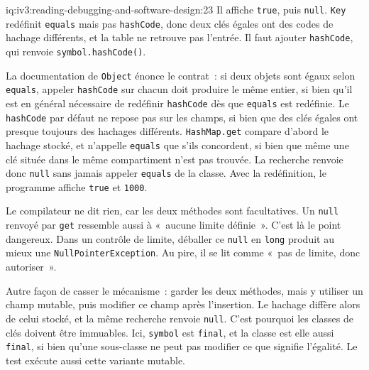 \begin{solution}{iq:iv3:reading-debugging-and-software-design:23}
Il affiche \texttt{true}, puis \texttt{null}. \texttt{Key} redéfinit \texttt{equals} mais pas \texttt{hashCode}, donc deux clés égales ont des codes de hachage différents, et la table ne retrouve pas l'entrée. Il faut ajouter \texttt{hashCode}, qui renvoie \texttt{symbol.hashCode()}.

La documentation de \texttt{Object} énonce le contrat~: si deux objets sont égaux selon \texttt{equals}, appeler \texttt{hashCode} sur chacun doit produire le même entier, si bien qu'il est en général nécessaire de redéfinir \texttt{hashCode} dès que \texttt{equals} est redéfinie. Le \texttt{hashCode} par défaut ne repose pas sur les champs, si bien que des clés égales ont presque toujours des hachages différents. \texttt{HashMap.get} compare d'abord le hachage stocké, et n'appelle \texttt{equals} que s'ils concordent, si bien que même une clé située dans le même compartiment n'est pas trouvée. La recherche renvoie donc \texttt{null} sans jamais appeler \texttt{equals} de la classe. Avec la redéfinition, le programme affiche \texttt{true} et \texttt{1000}.

Le compilateur ne dit rien, car les deux méthodes sont facultatives. Un \texttt{null} renvoyé par \texttt{get} ressemble aussi à «~aucune limite définie~». C'est là le point dangereux. Dans un contrôle de limite, déballer ce \texttt{null} en \texttt{long} produit au mieux une \texttt{NullPointerException}. Au pire, il se lit comme «~pas de limite, donc autoriser~».

Autre façon de casser le mécanisme~: garder les deux méthodes, mais y utiliser un champ mutable, puis modifier ce champ après l'insertion. Le hachage diffère alors de celui stocké, et la même recherche renvoie \texttt{null}. C'est pourquoi les classes de clés doivent être immuables. Ici, \texttt{symbol} est \texttt{final}, et la classe est elle aussi \texttt{final}, si bien qu'une sous-classe ne peut pas modifier ce que signifie l'égalité. Le test exécute aussi cette variante mutable.


\end{solution}

